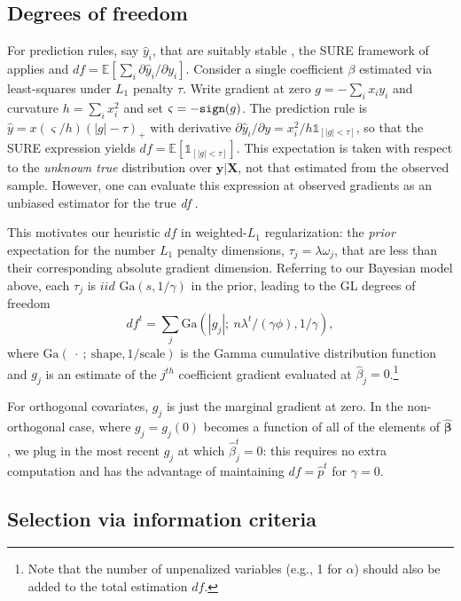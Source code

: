 \documentclass[12pt]{article}
\newcommand{\bs}[1]{\boldsymbol{#1}}
\newcommand{\mr}[1]{\mathrm{#1}}
\newcommand{\bm}[1]{\mathbf{#1}}
\newcommand{\ds}[1]{\mathds{#1}}
\begin{document}
\subsection{Degrees of freedom}


For prediction rules, say $\hat y_i$, that are suitably stable \citep[i.e.,
Lipschitz; see][]{zou_degrees_2007}, the SURE framework of
\cite{stein_estimation_1981} applies and  $df =
\ds{E}\left[\sum_i \partial \hat y_i/\partial y_i\right]$.
Consider  a single coefficient $\beta$ estimated via least-squares under $L_1$
penalty $\tau$.   Write gradient at zero $g = -\sum_i x_iy_i$ and curvature $h
= \sum_i x_i^2$ and set $\varsigma = -{\tt sign}(g)$. The prediction rule is
$\hat y = x(\varsigma/h)(|g|-\tau)_+$ with  derivative $\partial\hat y_i/\partial y = x_i^2/h \ds{1}_{[|g|<\tau]}$, so that the SURE expression
yields $df = \ds{E}\left[ \ds{1}_{[|g|<\tau]} \right]$.   This expectation is
taken with respect to the {\it unknown true} distribution over $\bm{y} |
\bm{X}$, not that estimated from the observed sample.  However, 
 one can evaluate this expression at observed
gradients as an unbiased estimator for the true \textit{df} \citep[e.g.,][]{zou_degrees_2007}.

This motivates our heuristic $df$ in weighted-$L_1$ regularization:  the {\it prior} expectation for the number  $L_1$ penalty dimensions, $\tau_j = \lambda \omega_j$, that are less than their corresponding absolute gradient dimension.  Referring to our Bayesian model above, each $\tau_j$ is $iid$ $\mr{Ga}(s,1/\gamma)$ in the prior,
leading to the GL degrees of freedom
\begin{equation}
\label{edf} df^t = \sum_j \mr{Ga}(|g_{j}|;~n\lambda^t/(\gamma\phi),
1/\gamma), \end{equation} where $\mr{Ga}(~\cdot~;~\mr{shape}, 1/\mr{scale})$
is the Gamma cumulative distribution function and $g_j$ is an estimate of  the
$j^{th}$ coefficient gradient evaluated at $\hat\beta_j=0$.\footnote{Note that the number of unpenalized variables (e.g., 1 for $\alpha$) should also be added to the total  estimation $df$. }

For  orthogonal covariates,  $g_j$ is just the marginal gradient at zero.
In the non-orthogonal case, where $g_{j} = g_j(0)$ becomes a
function of all of the elements of $\bs{\hat\beta}$, we plug in the most recent
$g_j$ at which $\hat\beta^t_j=0$:  this
requires no extra computation and has the advantage of maintaining $df =
\hat p^t$ for $\gamma = 0$.

\subsection{Selection via information criteria}
\end{document}
